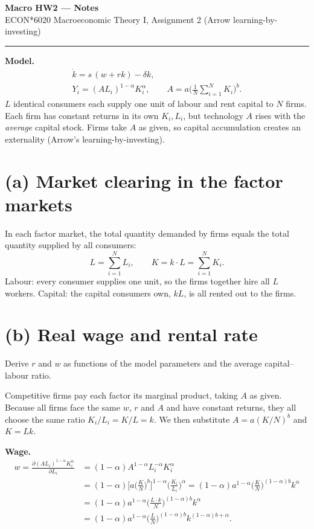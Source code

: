 \documentclass[11pt]{article}
\begin{document}
\begin{center}
{\Large\bfseries Macro HW2 --- Notes}\\[0.35em]
{\small ECON*6020 Macroeconomic Theory I, Assignment 2 (Arrow learning-by-investing)}
\end{center}

\hrule
\medskip

\textbf{Model.}
\begin{gather*}
\dot k = s\,(w + rk) - \delta k, \\
Y_i = (AL_i)^{1-\alpha}K_i^{\alpha}, \qquad
A = a\Big(\frac{1}{N}\sum_{i=1}^{N} K_i\Big)^{b}.
\end{gather*}
$L$ identical consumers each supply one unit of labour and rent capital to $N$ firms. Each firm has
constant returns in its own $K_i, L_i$, but technology $A$ rises with the \emph{average} capital
stock. Firms take $A$ as given, so capital accumulation creates an externality
(Arrow's learning-by-investing).

\section*{(a) Market clearing in the factor markets}

In each factor market, the total quantity demanded by firms equals the total quantity supplied by all consumers:
\[
L = \sum_{i=1}^{N} L_i, \qquad K = k\cdot L = \sum_{i=1}^{N} K_i .
\]
Labour: every consumer supplies one unit, so the firms together hire all $L$ workers.
Capital: the capital consumers own, $kL$, is all rented out to the firms.

\section*{(b) Real wage and rental rate}

Derive $r$ and $w$ as functions of the model parameters and the average capital--labour ratio.

Competitive firms pay each factor its marginal product, taking $A$ as given. Because all firms face
the same $w$, $r$ and $A$ and have constant returns, they all choose the same ratio
$K_i/L_i = K/L = k$. We then substitute $A = a(K/N)^b$ and $K = Lk$.

\textbf{Wage.}
\begin{align*}
w = \frac{\partial (AL_i)^{1-\alpha}K_i^{\alpha}}{\partial L_i}
  &= (1-\alpha)A^{1-\alpha}L_i^{-\alpha}K_i^{\alpha} \\
  &= (1-\alpha)\Big[a\Big(\frac{K}{N}\Big)^{b}\Big]^{1-\alpha}\Big(\frac{K_i}{L_i}\Big)^{\alpha}
   = (1-\alpha)a^{1-\alpha}\Big(\frac{K}{N}\Big)^{(1-\alpha)b}k^{\alpha} \\
  &= (1-\alpha)a^{1-\alpha}\Big(\frac{L\cdot k}{N}\Big)^{(1-\alpha)b}k^{\alpha} \\
  &= (1-\alpha)a^{1-\alpha}\Big(\frac{L}{N}\Big)^{(1-\alpha)b}k^{(1-\alpha)b+\alpha}.
\end{align*}
\end{document}
